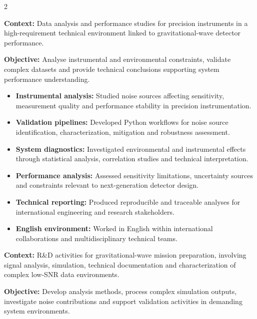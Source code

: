 \documentclass[8pt,a4paper,ragged2e,withhyper]{altacv}
\begin{document}
\begin{paracol}{2}
\divider


\textbf{Context:} Data analysis and performance studies for precision instruments in a high-requirement technical environment linked to gravitational-wave detector performance.

\textbf{Objective:} Analyse instrumental and environmental constraints, validate complex datasets and provide technical conclusions supporting system performance understanding.

\begin{itemize}
  \item \textbf{Instrumental analysis:} Studied noise sources affecting sensitivity, measurement quality and performance stability in precision instrumentation.
  \item \textbf{Validation pipelines:} Developed Python workflows for noise source identification, characterization, mitigation and robustness assessment.
  \item \textbf{System diagnostics:} Investigated environmental and instrumental effects through statistical analysis, correlation studies and technical interpretation.
  \item \textbf{Performance analysis:} Assessed sensitivity limitations, uncertainty sources and constraints relevant to next-generation detector design.
  \item \textbf{Technical reporting:} Produced reproducible and traceable analyses for international engineering and research stakeholders.
  \item \textbf{English environment:} Worked in English within international collaborations and multidisciplinary technical teams.
\end{itemize}

\divider


\textbf{Context:} R\&D activities for gravitational-wave mission preparation, involving signal analysis, simulation, technical documentation and characterization of complex low-SNR data environments.

\textbf{Objective:} Develop analysis methods, process complex simulation outputs, investigate noise contributions and support validation activities in demanding system environments.


\end{paracol}
\end{document}
